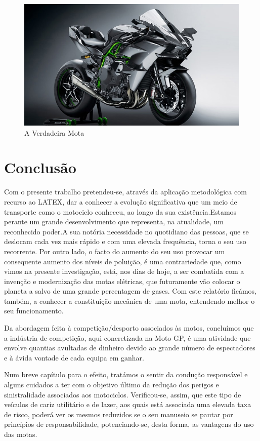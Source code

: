 \documentclass{report}
\begin{document}
\begin{figure}[h]
\center
\includegraphics [scale=0.5]{mota mais potente do mundo.jpg} %
\caption{A Verdadeira Mota}
\label{figura:"A Verdadeira Mota"}
\end{figure}


\chapter{Conclusão}
Com o presente trabalho pretendeu-se, através da aplicação metodológica com recurso ao LATEX, dar a conhecer a evolução significativa que um meio de transporte como o motociclo conheceu, ao longo da sua existência.Estamos perante um grande desenvolvimento que representa, na atualidade, um reconhecido poder.A sua notória necessidade no quotidiano das pessoas, que se deslocam cada vez mais rápido e com uma elevada frequência, torna o seu uso recorrente. Por outro lado, o facto do aumento do seu uso provocar um consequente aumento dos níveis de poluição, é uma contrariedade que, como vimos na presente investigação, está, nos dias de hoje, a ser combatida com a invenção e modernização das motas elétricas, que futuramente vão colocar o planeta a salvo de uma grande percentagem de gases. Com este relatório ficámos, também, a conhecer a constituição mecânica de uma mota, entendendo melhor o seu funcionamento.

Da abordagem feita à competição/desporto associados às motos, concluímos que a indústria de competição, aqui concretizada na Moto GP, é uma atividade que envolve quantias avultadas de dinheiro devido ao grande número de espectadores e à ávida vontade de cada equipa em ganhar.

Num breve capítulo para o efeito, tratámos o sentir da condução responsável e alguns cuidados a ter com o objetivo último da redução dos perigos e sinistralidade associados aos motociclos. Verificou-se, assim, que este tipo de veículos de cariz utilitário e de lazer, aos quais está associada uma elevada taxa de risco, poderá ver os mesmos reduzidos se o seu manuseio se pautar por princípios de responsabilidade, potenciando-se, desta forma, as vantagens do uso das motas.
\end{document}
